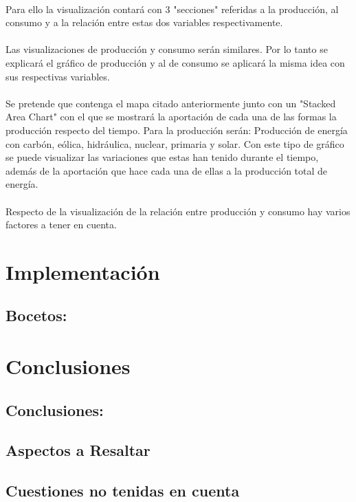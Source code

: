 \documentclass{article}
\begin{document}
				\paragraph{}
				Para ello la visualización contará con 3 "secciones" referidas a la producción, al consumo y a la relación entre estas dos variables respectivamente.

				\paragraph{}
				Las visualizaciones de producción y consumo serán similares. Por lo tanto se explicará el gráfico de producción y al de consumo se aplicará la misma idea con sus respectivas variables.

				\paragraph{}
				Se pretende que contenga el mapa citado anteriormente junto con un "Stacked Area Chart" con el que se mostrará la aportación de cada una de las formas la producción respecto del tiempo. Para la producción serán: Producción de energía con carbón, eólica, hidráulica, nuclear, primaria y solar. Con este tipo de gráfico se puede visualizar las variaciones que estas han tenido durante el tiempo, además de la aportación que hace cada una de ellas a la producción total de energía.

				\paragraph{}
				Respecto de la visualización de la relación entre producción y consumo hay varios factores a tener en cuenta.


	\section{Implementación}

		\subsection{Bocetos:}


	\section{Conclusiones}

		\subsection{Conclusiones:}


		\subsection{Aspectos a Resaltar}


		\subsection{Cuestiones no tenidas en cuenta}
\end{document}
